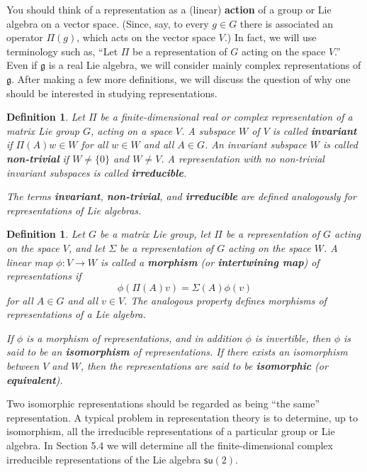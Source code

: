 \documentclass{amsbook}
\let \frak = \mathfrak
\theoremstyle{plain}
\newtheorem{definition}[theorem]{Definition}
\numberwithin{equation}{chapter}
\numberwithin{theorem}{chapter}
\begin{document}
You should think of a representation as a (linear) \textbf{action} of a group
or Lie algebra on a vector space. (Since, say, to every $g\in G$ there is
associated an operator $\Pi(g)$, which acts on the vector space $V$.) In fact,
we will use terminology such as, ``Let $\Pi$ be a representation of $G$ acting
on the space $V$.'' Even if $\frak{g}$ is a real Lie algebra, we will consider
mainly complex representations of $\frak{g}$. After making a few more
definitions, we will discuss the question of why one should be interested in
studying representations.

\begin{definition}
Let $\Pi$ be a finite-dimensional real or complex representation of a matrix
Lie group $G$, acting on a space $V$. A subspace $W$ of $V$ is called
\textbf{invariant} if $\Pi(A)w\in W$ for all $w\in W$ and all $A\in G$. An
invariant subspace $W$ is called \textbf{non-trivial} if $W\neq\{0\}$ and
$W\neq V$. A representation with no non-trivial invariant subspaces is called
\textbf{irreducible}.

The terms \textbf{invariant}, \textbf{non-trivial}, and \textbf{irreducible}
are defined analogously for representations of Lie algebras.
\end{definition}

\begin{definition}
Let $G$ be a matrix Lie group, let $\Pi$ be a representation of $G$ acting on
the space $V$, and let $\Sigma$ be a representation of $G$ acting on the space
$W$. A linear map $\phi:V\rightarrow W$ is called a \textbf{morphism} (or
\textbf{intertwining map}) of representations if
\[
\phi(\Pi(A)v)=\Sigma(A)\phi(v)
\]
for all $A\in G$ and all $v\in V$. The analogous property defines morphisms of
representations of a Lie algebra.

If $\phi$ is a morphism of representations, and in addition $\phi$ is
invertible, then $\phi$ is said to be an \textbf{isomorphism} of
representations. If there exists an isomorphism between $V$ and $W$, then the
representations are said to be \textbf{isomorphic} (or \textbf{equivalent}).
\end{definition}

Two isomorphic representations should be regarded as being ``the same''
representation. A typical problem in representation theory is to determine, up
to isomorphism, all the irreducible representations of a particular group or
Lie algebra. In Section 5.4 we will determine all the finite-dimensional
complex irreducible representations of the Lie algebra $\mathsf{su}(2)$.
\end{document}
